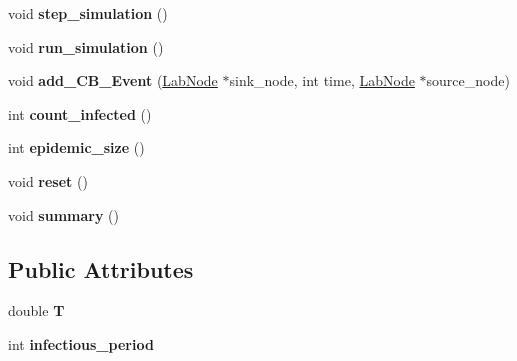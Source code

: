 \begin{DoxyCompactItemize}
\item 
\hypertarget{classstudy_1_1_chain_binomial___sim_a1f3310d3a117cf65befcd2fb752f2b4d}{void {\bfseries step\+\_\+simulation} ()}\label{classstudy_1_1_chain_binomial___sim_a1f3310d3a117cf65befcd2fb752f2b4d}

\item 
\hypertarget{classstudy_1_1_chain_binomial___sim_a47882a39fbb5c5369d29e9ce1fe91448}{void {\bfseries run\+\_\+simulation} ()}\label{classstudy_1_1_chain_binomial___sim_a47882a39fbb5c5369d29e9ce1fe91448}

\item 
\hypertarget{classstudy_1_1_chain_binomial___sim_aa348e0f408b84a989b83d16cf1994d7d}{void {\bfseries add\+\_\+\+C\+B\+\_\+\+Event} (\hyperlink{classelps_1_1_lab_node}{Lab\+Node} $\ast$sink\+\_\+node, int time, \hyperlink{classelps_1_1_lab_node}{Lab\+Node} $\ast$source\+\_\+node)}\label{classstudy_1_1_chain_binomial___sim_aa348e0f408b84a989b83d16cf1994d7d}

\item 
\hypertarget{classstudy_1_1_chain_binomial___sim_afdb30c27706b3bfeefdeb220e51a23d6}{int {\bfseries count\+\_\+infected} ()}\label{classstudy_1_1_chain_binomial___sim_afdb30c27706b3bfeefdeb220e51a23d6}

\item 
\hypertarget{classstudy_1_1_chain_binomial___sim_a8d065c4bf9402e99db5fe5cc795b4387}{int {\bfseries epidemic\+\_\+size} ()}\label{classstudy_1_1_chain_binomial___sim_a8d065c4bf9402e99db5fe5cc795b4387}

\item 
\hypertarget{classstudy_1_1_chain_binomial___sim_acc57e7eb49c0828bc49be7522aa12d18}{void {\bfseries reset} ()}\label{classstudy_1_1_chain_binomial___sim_acc57e7eb49c0828bc49be7522aa12d18}

\item 
\hypertarget{classstudy_1_1_chain_binomial___sim_afa3356b626fe4d37d3a72d5bc65ce5e0}{void {\bfseries summary} ()}\label{classstudy_1_1_chain_binomial___sim_afa3356b626fe4d37d3a72d5bc65ce5e0}

\end{DoxyCompactItemize}
\subsection*{Public Attributes}
\begin{DoxyCompactItemize}
\item 
\hypertarget{classstudy_1_1_chain_binomial___sim_af913eb58684fedd34a512af261333314}{double {\bfseries T}}\label{classstudy_1_1_chain_binomial___sim_af913eb58684fedd34a512af261333314}

\item 
\hypertarget{classstudy_1_1_chain_binomial___sim_aedb01f11386c0560346f0d29329c0100}{int {\bfseries infectious\+\_\+period}}\label{classstudy_1_1_chain_binomial___sim_aedb01f11386c0560346f0d29329c0100}

\end{DoxyCompactItemize}
